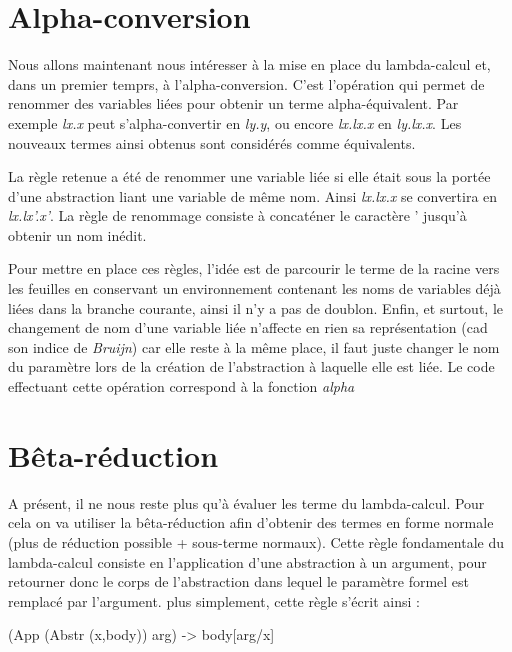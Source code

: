 \documentclass[11pt,a4paper]{report}
\begin{document}
\section{Alpha-conversion}
\bigskip
Nous allons maintenant nous intéresser à la mise en place du lambda-calcul et, dans un premier temprs, à l'alpha-conversion. C'est l'opération qui permet de renommer des variables liées pour obtenir un terme alpha-équivalent. Par exemple \textit{lx.x} peut s'alpha-convertir en \textit{ly.y}, ou encore \textit{lx.lx.x} en \textit{ly.lx.x}. Les nouveaux termes ainsi obtenus sont considérés comme équivalents.

\smallskip

La règle retenue a été de renommer une variable liée si elle était sous la portée d'une abstraction liant une variable de même nom. Ainsi \textit{lx.lx.x} se convertira en \textit{lx.lx'.x'}. La règle de renommage consiste à concaténer le caractère ' jusqu'à obtenir un nom inédit.

\smallskip

Pour mettre en place ces règles, l'idée est de parcourir le terme de la racine vers les feuilles en conservant un environnement contenant les noms de variables déjà liées dans la branche courante, ainsi il n'y a pas de doublon. Enfin, et surtout, le changement de nom d'une variable liée n'affecte en rien sa représentation (cad son indice de \textit{Bruijn}) car elle reste à la même place, il faut juste changer le nom du paramètre lors de la création de l'abstraction à laquelle elle est liée. Le code effectuant cette opération correspond à la fonction \textit{alpha}

\section{Bêta-réduction}

A présent, il ne nous reste plus qu'à évaluer les terme du lambda-calcul. Pour cela on va utiliser la bêta-réduction afin d'obtenir des termes en forme normale (plus de réduction possible + sous-terme normaux). Cette règle fondamentale du lambda-calcul consiste en l'application d'une abstraction à un argument, pour retourner donc le corps de l'abstraction dans lequel le paramètre formel est remplacé par l'argument. plus simplement, cette règle s'écrit ainsi :

\medskip

(App (Abstr (x,body)) arg) -> body[arg/x]

\medskip
\end{document}
